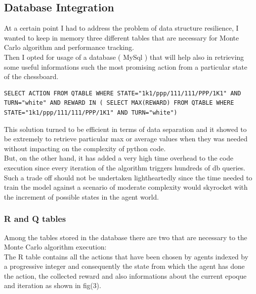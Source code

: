 \documentclass{article}
\begin{document}
				\newpage
				\subsection{Database Integration}

				At a certain point I had to address the problem of data structure resilience, I wanted to keep in memory three different tables that are necessary for Monte Carlo algorithm and performance tracking.\medskip\\
				Then I opted for usage of a database ( MySql ) that will help also in retrieving some useful informations such the most promising action from a particular state of the chessboard.\medskip\\
				\begin{lstlisting}[caption= db query for best action, label=exepred]
SELECT ACTION FROM QTABLE WHERE STATE="1k1/ppp/111/111/PPP/1K1" AND TURN="white" AND REWARD IN ( SELECT MAX(REWARD) FROM QTABLE WHERE STATE="1k1/ppp/111/111/PPP/1K1" AND TURN="white")
				\end{lstlisting}

				This solution turned to be efficient in terms of data separation and it showed to be extremely to retrieve particular max or average values when they was needed without impacting on the complexity of python code.\medskip\\
				But, on the other hand, it has added a very high time overhead to the code execution since every iteration of the algorithm triggers hundreds of db queries.\medskip\\
				Such a trade off should not be undertaken lightheartedly since the time needed to train the model against a scenario of moderate complexity would skyrocket with the increment of possible states in the agent world.\medskip\\


				\newpage

				\subsubsection{ R and Q tables}
				Among the tables stored in the database there are two that are necessary to the Monte Carlo algorithm execution:\medskip\\
				The R table contains all the actions that have been chosen by agents indexed by a progressive integer and consequently the state from which the agent has done the action, the collected reward and also informations about the current epoque and iteration as shown in fig(3).\medskip\\
		
\end{document}
